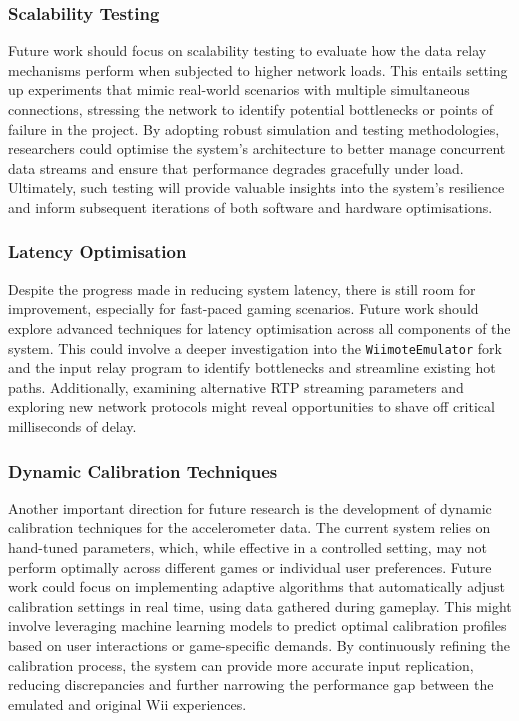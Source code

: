 \subsubsection{Scalability Testing}
Future work should focus on scalability testing to evaluate how the data relay
mechanisms perform when subjected to higher network loads. This entails setting
up experiments that mimic real-world scenarios with multiple simultaneous
connections, stressing the network to identify potential
bottlenecks or points of failure in the project. By adopting robust simulation and testing
methodologies, researchers could optimise the system’s architecture to better
manage concurrent data streams and ensure that performance degrades gracefully
under load. Ultimately, such testing will provide valuable insights into the
system’s resilience and inform subsequent iterations of both software and
hardware optimisations.

\subsubsection{Latency Optimisation}
Despite the progress made in reducing system latency, there is still room for
improvement, especially for fast-paced gaming scenarios. Future work should
explore advanced techniques for latency optimisation across all components of
the system. This could involve a deeper investigation into the
\texttt{WiimoteEmulator} fork and the input relay program to identify
bottlenecks and streamline existing hot paths. Additionally, examining
alternative RTP streaming parameters and exploring new network protocols might
reveal opportunities to shave off critical milliseconds of delay.

\subsubsection{Dynamic Calibration Techniques}
Another important direction for future research is the development of dynamic
calibration techniques for the accelerometer data. The current system relies on
hand-tuned parameters, which, while effective in a controlled setting, may not
perform optimally across different games or individual user preferences. Future
work could focus on implementing adaptive algorithms that automatically adjust
calibration settings in real time, using data gathered during gameplay. This
might involve leveraging machine learning models to predict optimal calibration
profiles based on user interactions or game-specific demands. By continuously
refining the calibration process, the system can provide more accurate input
replication, reducing discrepancies and further narrowing the performance gap
between the emulated and original Wii experiences.
